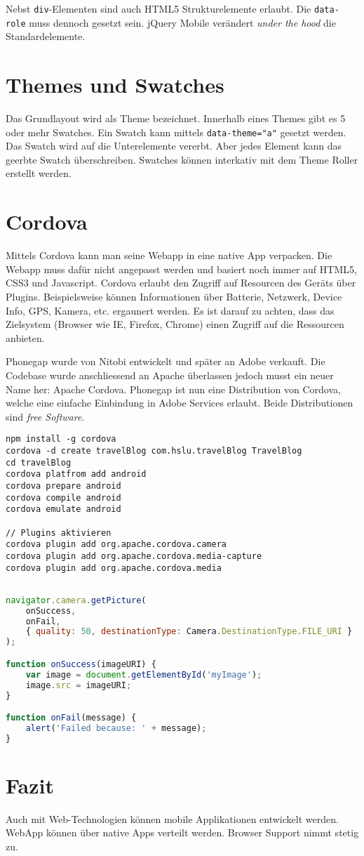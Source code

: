 Nebst \verb|div|-Elementen sind auch HTML5 Strukturelemente erlaubt. Die \verb|data-role| muss dennoch gesetzt sein. jQuery Mobile verändert \textit{under the hood} die Standardelemente.

\section{Themes und Swatches}
Das Grundlayout wird als Theme bezeichnet. Innerhalb eines Themes gibt es 5 oder mehr Swatches. Ein Swatch kann mittels \verb|data-theme="a"| gesetzt werden. Das Swatch wird auf die Unterelemente vererbt. Aber jedes Element kann das geerbte Swatch überschreiben. Swatches können interkativ mit dem Theme Roller erstellt werden.

\section{Cordova}
Mittels Cordova kann man seine Webapp in eine native App verpacken. Die Webapp muss dafür nicht angepasst werden und basiert noch immer auf HTML5, CSS3 und Javascript. Cordova erlaubt den Zugriff auf Resourcen des Geräts über Plugins. Beispielsweise können Informationen über Batterie, Netzwerk, Device Info, GPS, Kamera, etc. ergaunert werden. Es ist darauf zu achten, dass das Zielsystem (Browser wie IE, Firefox, Chrome) einen Zugriff auf die Ressourcen anbieten.

Phonegap wurde von Nitobi entwickelt und später an Adobe verkauft. Die Codebase wurde anschliessend an Apache überlassen jedoch musst ein neuer Name her: Apache Cordova. Phonegap ist nun eine Distribution von Cordova, welche eine einfache Einbindung in Adobe Services erlaubt. Beide Distributionen sind \textit{free Software}.

\begin{lstlisting}[label=lst:Cordova,caption=Cordova]
npm install -g cordova
cordova -d create travelBlog com.hslu.travelBlog TravelBlog
cd travelBlog
cordova platfrom add android
cordova prepare android
cordova compile android
cordova emulate android

// Plugins aktivieren
cordova plugin add org.apache.cordova.camera
cordova plugin add org.apache.cordova.media-capture
cordova plugin add org.apache.cordova.media
\end{lstlisting}

\newpage

\begin{lstlisting}[language=Javascript,label=lst:cordova-javascript,caption=Cordova Javascript Camera]

navigator.camera.getPicture(
	onSuccess,
	onFail, 
	{ quality: 50, destinationType: Camera.DestinationType.FILE_URI }
);

function onSuccess(imageURI) {
	var image = document.getElementById('myImage');
	image.src = imageURI;
}

function onFail(message) {
	alert('Failed because: ' + message);
}
\end{lstlisting}

\section{Fazit}
Auch mit Web-Technologien können mobile Applikationen entwickelt werden. WebApp können über native Apps verteilt werden. Browser Support nimmt stetig zu. 